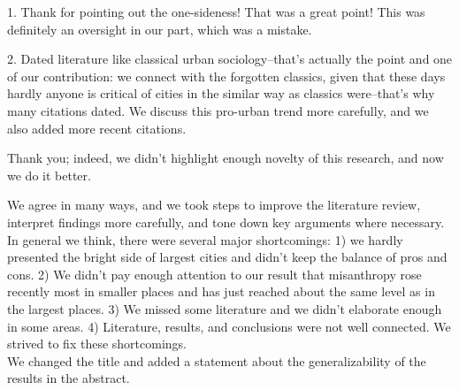 1. Thank for pointing out the one-sideness! That was a great point! This was definitely an oversight in our part, %
which was a mistake. %


2. Dated literature like classical urban sociology--that's actually the point and one of
our contribution: we connect with the forgotten classics, given that these days hardly anyone is critical of cities in the similar way as classics were--that's why many citations dated. We discuss this pro-urban trend more carefully, and we also added more recent citations.  


Thank you; indeed, we didn't highlight enough novelty of this research, and now we do it better. 


We agree in many ways, and we took steps to improve the literature review,
interpret findings more carefully, and tone down key arguments where necessary.\\

In general we think,
there were several major shortcomings: 1) we hardly presented the bright side of
largest cities and didn't keep the balance of pros and cons. 2) We didn't pay enough attention to our result that misanthropy rose recently most in smaller
places and has just reached about the same level as in the largest places. 3) We
missed some literature and we didn't elaborate enough in some areas.
4) Literature, results, and conclusions were not well connected.
 We strived to fix these shortcomings.\\ 
 
 We changed the title and added a statement about the generalizability of the results in the abstract. \\

